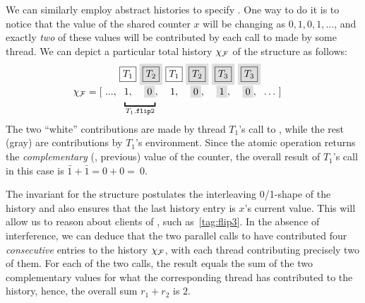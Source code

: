 We can similarly employ abstract histories to specify
. One way to do it is to notice that the value of the
shared counter $x$ will be changing as $0, 1, 0, 1, \ldots$, and
exactly \emph{two} of these values will be contributed by each call to
 made by some thread. We can depict a particular total
history $\chi_{\cal F}$ of the  structure as follows:
%
\[
%
\!\!\!\!\!\!\!\!
%
\begin{array}{r@{\ }c@{\ }c@{\ }c@{\ }c@{\ }c@{\ }c@{\ }c@{\ }c@{\ }l@{\ }}
  & & \boxed{T_1} & \graybox{\boxed{T_2}} & {\boxed{T_1}} & \graybox{\boxed{T_2}} & \graybox{\boxed{T_3}}
  & \graybox{\boxed{T_3}} 
  \\[5pt] 
  \hist_{\cal F} = \text{[} & ..., & 1, & \graybox{0}, & 
                                 1, & \graybox{0}, &  \graybox{1}, & \graybox{0}, &
                                                                          \ldots
                     &
                       \text{]}   
\\[-5pt] 
&& \multicolumn{3}{l}{{\underbracket{\phantom{aaaaaa}}_{T_1.\mathtt{flip2}}}}
\end{array}
\]
%
The two ``white'' contributions are made by thread $T_1$'s call to
, while the rest (gray) are contributions by $T_1$'s
environment. Since the atomic  operation returns the
\emph{complementary} (\ie, previous) value of the counter, the overall
result of $T_1$'s call in this case is $\bar{1} + \bar{1} = 0 + 0
=~0$.

The invariant for the  structure postulates the
interleaving 0/1-shape of the history and also ensures that the last
history entry is $x$'s current value. This will allow us to reason
about clients of , such as~\eqref{tag:flip3}.
%
%
In the absence of interference, we can deduce that the two parallel
calls to  have contributed four \emph{consecutive} entries
to the history $\chi_{\cal F}$, with each thread contributing
precisely two of them. For each of the two calls, the result equals
the sum of the two complementary values for what the corresponding
thread has contributed to the history, hence, the overall sum
$r_1 + r_2$ is $2$.


